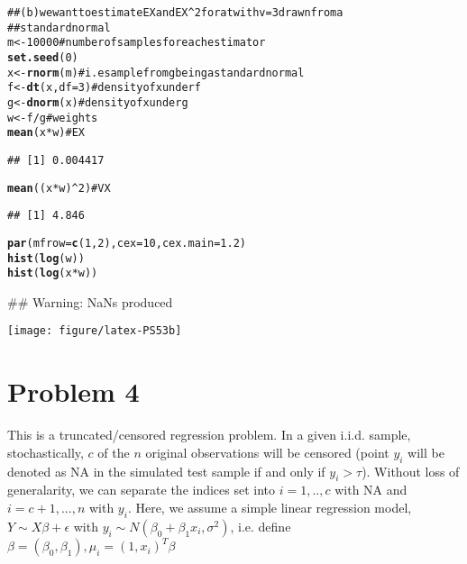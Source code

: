 \documentclass{article}\usepackage{graphicx, color}
\makeatletter
\def\maxwidth{ %
  \ifdim\Gin@nat@width>\linewidth
    \linewidth
  \else
    \Gin@nat@width
  \fi
}
\newcommand{\hlfunctioncall}[1]{\textcolor[rgb]{0.501960784313725,0,0.329411764705882}{\textbf{#1}}}%
\newcommand{\hlcomment}[1]{\textcolor[rgb]{0.180392156862745,0.6,0.341176470588235}{#1}}%
\newenvironment{kframe}{%
 \def\at@end@of@kframe{}%
 \ifinner\ifhmode%
  \def\at@end@of@kframe{\end{minipage}}%
  \begin{minipage}{\columnwidth}%
 \fi\fi%
 \def\FrameCommand##1{\hskip\@totalleftmargin \hskip-\fboxsep
 \colorbox{shadecolor}{##1}\hskip-\fboxsep
     \hskip-\linewidth \hskip-\@totalleftmargin \hskip\columnwidth}%
 \MakeFramed {\advance\hsize-\width
   \@totalleftmargin\z@ \linewidth\hsize
   \@setminipage}}%
 {\par\unskip\endMakeFramed%
 \at@end@of@kframe}
\newenvironment{knitrout}{}{} %
\makeatother
\begin{document}
\begin{knitrout}
\color{fgcolor}\begin{kframe}
\begin{alltt}
\hlcomment{## (b) we want to estimate EX and EX^2 for a t with v=3 drawn from a}
\hlcomment{## standard normal}
m <- 10000  \hlcomment{# number of samples for each estimator}
\hlfunctioncall{set.seed}(0)
x <- \hlfunctioncall{rnorm}(m)  \hlcomment{# i.e sample from g being a standard normal}
f <- \hlfunctioncall{dt}(x, df = 3)  \hlcomment{# density of x under f}
g <- \hlfunctioncall{dnorm}(x)  \hlcomment{# density of x under g}
w <- f/g  \hlcomment{# weights}
\hlfunctioncall{mean}(x * w)  \hlcomment{#EX}
\end{alltt}
\begin{verbatim}
## [1] 0.004417
\end{verbatim}
\begin{alltt}
\hlfunctioncall{mean}((x * w)^2)  \hlcomment{#VX}
\end{alltt}
\begin{verbatim}
## [1] 4.846
\end{verbatim}
\begin{alltt}

\hlfunctioncall{par}(mfrow = \hlfunctioncall{c}(1, 2), cex = 10, cex.main = 1.2)
\hlfunctioncall{hist}(\hlfunctioncall{log}(w))
\hlfunctioncall{hist}(\hlfunctioncall{log}(x * w))
\end{alltt}


{\ttfamily\noindent\textcolor{warningcolor}{\#\# Warning: NaNs produced}}\end{kframe}

{\centering \texttt{[image: figure/latex-PS53b]} 

}



\end{knitrout}



\newpage
\section*{Problem 4}

\hspace{12 pt} This is a truncated/censored regression problem. In a given i.i.d. sample, stochastically, $c$ of the $n$ original observations
will be censored (point $y_i$ will be denoted as NA in the simulated test sample if and only if $y_i > \tau$). Without loss of generalarity, 
we can separate the indices set into $i=1, .., c$ with NA and $i=c+1, ..., n$ with $y_i$. 
Here, we assume a simple linear regression model, 
$Y\sim X\beta + \epsilon$ with $y_i\sim N(\beta_0+\beta_1x_i,\sigma^2)$, i.e. define $\beta=(\beta_0,\beta_1), \mu_i=(1, x_i)^T\beta$
\end{document}
